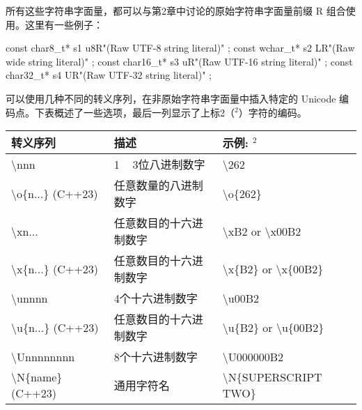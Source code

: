 所有这些字符串字面量，都可以与第2章中讨论的原始字符串字面量前缀 R 组合使用。这里有一些例子：

\begin{cpp}
const char8_t* s1 { u8R"(Raw UTF-8 string literal)" };
const wchar_t* s2 { LR"(Raw wide string literal)" };
const char16_t* s3 { uR"(Raw UTF-16 string literal)" };
const char32_t* s4 { UR"(Raw UTF-32 string literal)" };
\end{cpp}

可以使用几种不同的转义序列，在非原始字符串字面量中插入特定的 Unicode 编码点。下表概述了一些选项，最后一列显示了上标2（$^2$）字符的编码。

\begin{longtable}{|l|l|l|}
\hline
\textbf{转义序列}          & \textbf{描述}                   & \textbf{示例:  $^2$}                                  \\ \hline
\endfirsthead
%
\endhead
%
\textbackslash{}nnn               & 1 ~ 3位八进制数字                    & \textbackslash{}262                                  \\ \hline
\textbackslash{}o\{n...\} (C++23) & 任意数量的八进制数字       & \textbackslash{}o\{262\}                             \\ \hline
\textbackslash{}xn...             & 任意数目的十六进制数字 & \textbackslash{}xB2 or \textbackslash{}x00B2         \\ \hline
\textbackslash{}x\{n...\} (C++23) & 任意数目的十六进制数字 & \textbackslash{}x\{B2\} or \textbackslash{}x\{00B2\} \\ \hline
\textbackslash{}unnnn             & 4个十六进制数字                   & \textbackslash{}u00B2                                \\ \hline
\textbackslash{}u\{n...\} (C++23) & 任意数目的十六进制数字 & \textbackslash{}u\{B2\} or \textbackslash{}u\{00B2\} \\ \hline
\textbackslash{}Unnnnnnnn         & 8个十六进制数字                   & \textbackslash{}U000000B2                            \\ \hline
\textbackslash{}N\{name\} (C++23) & 通用字符名               & \textbackslash{}N\{SUPERSCRIPT TWO\}                 \\ \hline
\end{longtable}

